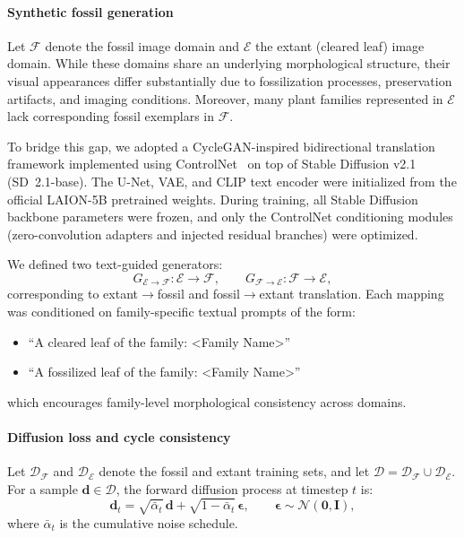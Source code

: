 \documentclass[pdflatex,lineno,sn-nature]{sn-jnl}%
\theoremstyle{plain}%
\theoremstyle{definition}%
\theoremstyle{remark}%
\begin{document}
\paragraph{Synthetic fossil generation}
Let $\mathcal{F}$ denote the fossil image domain and $\mathcal{E}$ the extant (cleared leaf) image domain. While these domains share an underlying morphological structure, their visual appearances differ substantially due to fossilization processes, preservation artifacts, and imaging conditions. Moreover, many plant families represented in $\mathcal{E}$ lack corresponding fossil exemplars in $\mathcal{F}$.

To bridge this gap, we adopted a CycleGAN-inspired bidirectional translation framework implemented using ControlNet~\citep{zhang2023adding} on top of Stable Diffusion v2.1 (SD~2.1-base). The U-Net, VAE, and CLIP text encoder were initialized from the official LAION-5B pretrained weights. During training, all Stable Diffusion backbone parameters were frozen, and only the ControlNet conditioning modules (zero-convolution adapters and injected residual branches) were optimized.

We defined two text-guided generators:
\[
G_{\mathcal{E}\rightarrow\mathcal{F}} : \mathcal{E} \rightarrow \mathcal{F},
\qquad
G_{\mathcal{F}\rightarrow\mathcal{E}} : \mathcal{F} \rightarrow \mathcal{E},
\]
corresponding to extant$\rightarrow$fossil and fossil$\rightarrow$extant translation. Each mapping was conditioned on family-specific textual prompts of the form:
\begin{itemize}
    \item ``A cleared leaf of the family: \textless Family Name\textgreater''
    \item ``A fossilized leaf of the family: \textless Family Name\textgreater''
\end{itemize}
which encourages family-level morphological consistency across domains.


\paragraph{Diffusion loss and cycle consistency}
Let $\mathcal{D}_{\mathcal{F}}$ and $\mathcal{D}_{\mathcal{E}}$ denote the fossil and extant training sets, and let $\mathcal{D}=\mathcal{D}_{\mathcal{F}}\cup\mathcal{D}_{\mathcal{E}}$. For a sample $\mathbf{d}\in\mathcal{D}$, the forward diffusion process at timestep $t$ is:
\[
\mathbf{d}_t
=
\sqrt{\bar{\alpha}_t}\,\mathbf{d}
+
\sqrt{1-\bar{\alpha}_t}\,\boldsymbol{\epsilon},
\qquad
\boldsymbol{\epsilon} \sim \mathcal{N}(\mathbf{0}, \mathbf{I}),
\]
where $\bar{\alpha}_t$ is the cumulative noise schedule. 
\end{document}
